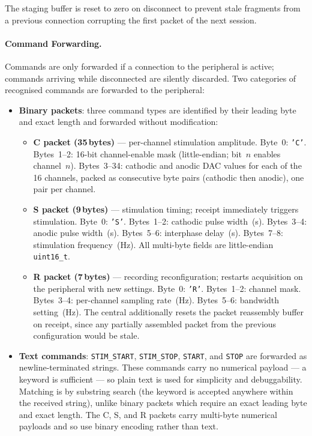 The staging buffer is reset to zero on disconnect to prevent stale fragments
from a previous connection corrupting the first packet of the next session.

\paragraph{Command Forwarding.}
Commands are only forwarded if a connection to the peripheral is active;
commands arriving while disconnected are silently discarded. Two categories of
recognised commands are forwarded to the peripheral:

\begin{itemize}
    \item \textbf{Binary packets}: three command types are identified by their
    leading byte and exact length and forwarded without modification:
    \begin{itemize}
        \item \textbf{C packet (35\,bytes)} --- per-channel stimulation
        amplitude. Byte~0: \texttt{'C'}. Bytes~1--2: 16-bit channel-enable
        mask (little-endian; bit~$n$ enables channel~$n$). Bytes~3--34:
        cathodic and anodic DAC values for each of the 16 channels, packed as
        consecutive byte pairs (cathodic then anodic), one pair per channel.
        \item \textbf{S packet (9\,bytes)} --- stimulation timing; receipt
        immediately triggers stimulation. Byte~0: \texttt{'S'}. Bytes~1--2:
        cathodic pulse width~(\textmu s). Bytes~3--4: anodic pulse
        width~(\textmu s). Bytes~5--6: interphase delay~(\textmu s).
        Bytes~7--8: stimulation frequency~(Hz). All multi-byte fields are
        little-endian \texttt{uint16\_t}.
        \item \textbf{R packet (7\,bytes)} --- recording reconfiguration;
        restarts acquisition on the peripheral with new settings. Byte~0:
        \texttt{'R'}. Bytes~1--2: channel mask. Bytes~3--4: per-channel
        sampling rate~(Hz). Bytes~5--6: bandwidth setting~(Hz).
        The central additionally resets the packet reassembly buffer on
        receipt, since any partially assembled packet from the previous
        configuration would be stale.
    \end{itemize}
    \item \textbf{Text commands}: \texttt{STIM\_START}, \texttt{STIM\_STOP},
    \texttt{START}, and \texttt{STOP} are forwarded as newline-terminated
    strings. These commands carry no numerical payload --- a keyword is
    sufficient --- so plain text is used for simplicity and debuggability.
    Matching is by substring search (the keyword is accepted anywhere within
    the received string), unlike binary packets which require an exact leading
    byte and exact length. The C, S, and R packets carry multi-byte numerical
    payloads and so use binary encoding rather than text.
\end{itemize}

